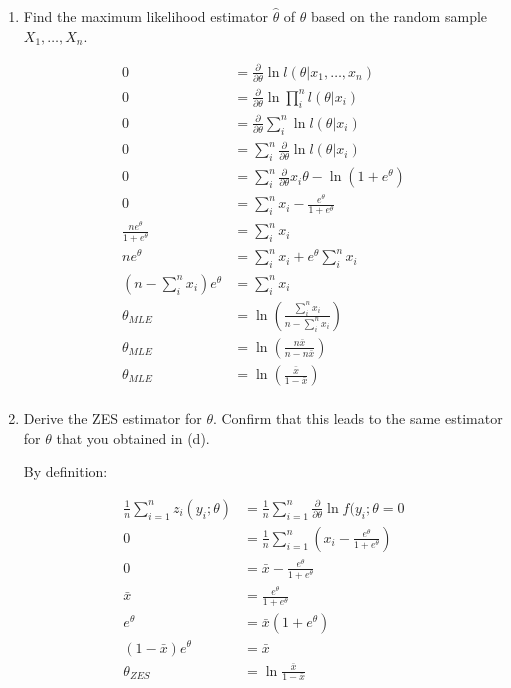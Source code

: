 \documentclass{article}
\newcommand{\1}{\mathbf{1}}
\begin{document}
\begin{enumerate}
    \newpage
    \item Find the maximum likelihood estimator $\hat{\theta}$ of $\theta$ based on the random sample $X_1,\ldots , X_n$.
    
    \begin{align*}
       0 &= \frac{\partial }{\partial\theta} \ln l(\theta | x_1,\hdots,x_n) \\
       0 &= \frac{\partial }{\partial\theta} \ln \prod_i^n l(\theta | x_i) \\
       0 &= \frac{\partial }{\partial\theta} \sum_i^n \ln l(\theta | x_i) \\
       0 &= \sum_i^n \frac{\partial }{\partial\theta}  \ln l(\theta | x_i) \\
       0 &= \sum_i^n \frac{\partial }{\partial\theta}  x_i\theta - \ln{(1+e^\theta)} \\
       0 &= \sum_i^n x_i - \frac{e^\theta}{1+e^\theta} \\
       \frac{ne^\theta}{1+e^\theta} &= \sum_i^n x_i \\
       ne^\theta &= \sum_i^n x_i + e^\theta\sum_i^n x_i \\
       \left(n - \sum_i^n x_i\right) e^\theta &= \sum_i^n x_i \\
       \theta_{MLE} &= \ln{\left( \frac{\sum_i^n x_i}{n - \sum_i^n x_i} \right)  } \\
       \theta_{MLE} &= \ln{\left( \frac{n\bar x}{n - n\bar x} \right)  } \\
       \theta_{MLE} &= \ln{\left( \frac{\bar x}{1 - \bar x} \right)  } \\
    \end{align*}
    
    \newpage
    \item Derive the ZES estimator for $\theta$. Confirm that this leads to the same estimator for $\theta$ that you obtained in (d).
    
    By definition:
    
    \begin{align*}
        \frac{1}{n}\sum_{i=1}^n z_i(y_i ; \theta) &= \frac{1}{n} \sum_{i=1}^n \frac{\partial}{\partial \theta} \ln{f(y_i; \theta} = 0\\
        0 &= \frac{1}{n} \sum_{i=1}^n  \left( x_i - \frac{e^\theta}{1+e^\theta} \right) \\
        0 &= \bar x - \frac{e^\theta}{1+e^\theta} \\
        \bar x &= \frac{e^\theta}{1+e^\theta} \\
        e^\theta &= \bar x (1+e^\theta) \\
        (1 - \bar x) e^\theta &= \bar x \\
        \theta_{ZES} &= \ln{\frac{\bar x}{1-\bar x}}
    \end{align*}
    

\end{enumerate}
\end{document}
